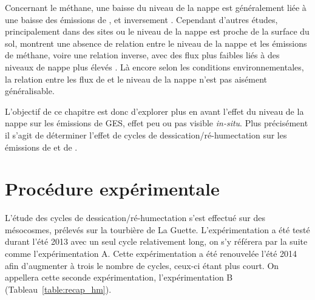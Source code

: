 Concernant le méthane, une baisse du niveau de la nappe est généralement liée à une baisse des émissions de \chh, et inversement \citep{strack2006,pelletier2007,turetsky2008}.
Cependant d'autres études, principalement dans des sites ou le niveau de la nappe est proche de la surface du sol, montrent une absence de relation entre le niveau de la nappe et les émissions de méthane, voire une relation inverse, avec des flux plus faibles liés à des niveaux de nappe plus élevés \citep{kettunen1996,bellisario1999,treat2007}.
Là encore selon les conditions environnementales, la relation entre les flux de \chh et le niveau de la nappe n'est pas aisément généralisable.

L'objectif de ce chapitre est donc d'explorer plus en avant l'effet du niveau de la nappe sur les émissions de GES, effet peu ou pas visible \textit{in-situ}.
Plus précisément il s'agit de déterminer l'effet de cycles de dessication/ré-humectation sur les émissions de \coo et de \chh. 

\section{Procédure expérimentale}

L'étude des cycles de dessication/ré-humectation s'est effectué sur des mésocosmes, prélevés sur la tourbière de La Guette.
L'expérimentation a été testé durant l'été 2013 avec un seul cycle relativement long, on s'y référera par la suite comme l'expérimentation A.
Cette expérimentation a été renouvelée l'été 2014 afin d'augmenter à trois le nombre de cycles, ceux-ci étant plus court.
On appellera cette seconde expérimentation, l'expérimentation B (Tableau~\ref{table:recap_hm}).


